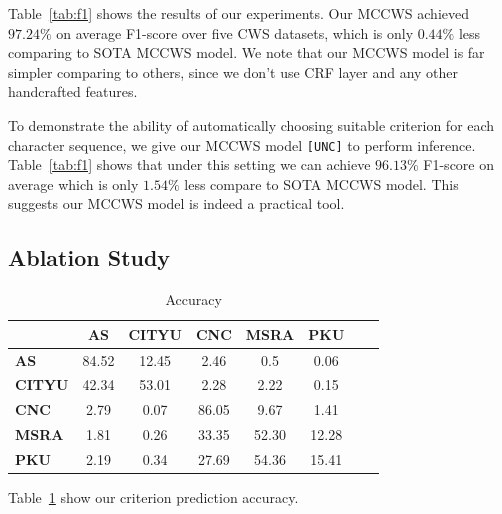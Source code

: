 \documentclass[11pt]{article}
\newcommand{\UNC}{\texttt{[UNC]}}
\begin{document}
Table~\ref{tab:f1} shows the results of our experiments.
Our MCCWS achieved \(97.24\%\) on average F1-score over five CWS datasets, which is only \(0.44\%\) less comparing to SOTA MCCWS model.
We note that our MCCWS model is far simpler comparing to others, since we don't use CRF layer and any other handcrafted features.

To demonstrate the ability of automatically choosing suitable criterion for each character sequence, we give our MCCWS model \UNC{} to perform inference.
Table~\ref{tab:f1} shows that under this setting we can achieve \(96.13\%\) F1-score on average which is only \(1.54\%\) less compare to SOTA MCCWS model.
This suggests our MCCWS model is indeed a practical tool.

\subsection{Ablation Study}

\begin{table}[t]
  \caption{Accuracy}
  \label{tab:acc}
  \centering
  \begin{tabular}{lccccccc}
    \hline
                   & \textbf{AS} & \textbf{CITYU} & \textbf{CNC} & \textbf{MSRA} & \textbf{PKU} \\
    \hline
    \textbf{AS}    & 84.52       & 12.45          & 2.46         & 0.5           & 0.06         \\
    \textbf{CITYU} & 42.34       & 53.01          & 2.28         & 2.22          & 0.15         \\
    \textbf{CNC}   & 2.79        & 0.07           & 86.05        & 9.67          & 1.41         \\
    \textbf{MSRA}  & 1.81        & 0.26           & 33.35        & 52.30         & 12.28        \\
    \textbf{PKU}   & 2.19        & 0.34           & 27.69        & 54.36         & 15.41        \\
    \hline
  \end{tabular}
\end{table}

Table~\ref{tab:acc} show our criterion prediction accuracy.
\end{document}
